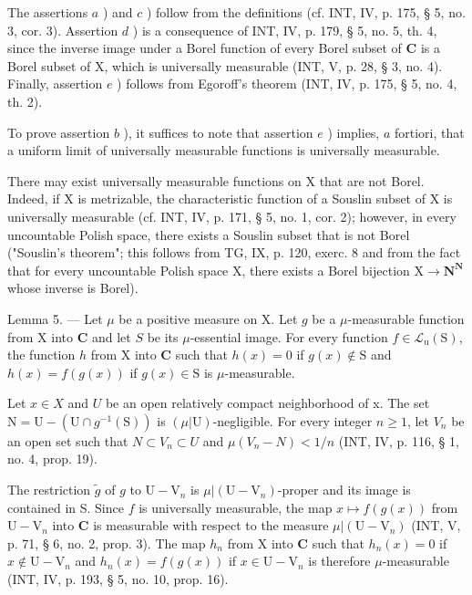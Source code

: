 The assertions \(a\) ) and \(c\) ) follow from the definitions (cf. INT, IV, p. 175, § 5, no. 3, cor. 3). Assertion \(d\) ) is a consequence of INT, IV, p. 179, § 5, no. 5, th. 4, since the inverse image under a Borel function of every Borel subset of \(\mathbf{C}\) is a Borel subset of X, which is universally measurable (INT, V, p. 28, § 3, no. 4). Finally, assertion \(e\) ) follows from Egoroff's theorem (INT, IV, p. 175, § 5, no. 4, th. 2).

To prove assertion \(b\) ), it suffices to note that assertion \(e\) ) implies, \(a\) fortiori, that a uniform limit of universally measurable functions is universally measurable.

There may exist universally measurable functions on X that are not Borel. Indeed, if X is metrizable, the characteristic function of a Souslin subset of X is universally measurable (cf. INT, IV, p. 171, § 5, no. 1, cor. 2); however, in every uncountable Polish space, there exists a Souslin subset that is not Borel ("Souslin's theorem"; this follows from TG, IX, p. 120, exerc. 8 and from the fact that for every uncountable Polish space X, there exists a Borel bijection \(\mathrm{X}\to\mathbf{N}^{\mathbf{N}}\) whose inverse is Borel).

Lemma 5. --- Let \(\mu\) be a positive measure on X. Let \(g\) be a \(\mu\)-measurable function from X into \(\mathbf{C}\) and let \(S\) be its \(\mu\)-essential image. For every function \(f \in \mathcal{L}_{\mathrm{u}}(\mathrm{S})\), the function \(h\) from X into \(\mathbf{C}\) such that \(h(x) = 0\) if \(g(x) \notin \mathrm{S}\) and \(h(x) = f(g(x))\) if \(g(x) \in \mathrm{S}\) is \(\mu\)-measurable.

Let \(x \in X\) and \(U\) be an open relatively compact neighborhood of x. The set \(\mathrm{N} = \mathrm{U} - (\mathrm{U} \cap g^{-1}(\mathrm{S}))\) is \((\mu|\mathrm{U})\)-negligible. For every integer \(n \geqslant 1\), let \(V_{n}\) be an open set such that \(N \subset V_{n} \subset U\) and \(\mu(V_{n} - N) < 1/n\) (INT, IV, p. 116, § 1, no. 4, prop. 19).

The restriction \(\widetilde{g}\) of \(g\) to \(\mathrm{U}-\mathrm{V}_n\) is \(\mu|(\mathrm{U}-\mathrm{V}_n)\)-proper and its image is contained in S. Since \(f\) is universally measurable, the map \(x\mapsto f(g(x))\) from \(\mathrm{U}-\mathrm{V}_n\) into \(\mathbf{C}\) is measurable with respect to the measure \(\mu|(\mathrm{U}-\mathrm{V}_n)\) (INT, V, p. 71, § 6, no. 2, prop. 3). The map \(h_n\) from X into \(\mathbf{C}\) such that \(h_n(x) = 0\) if \(x\notin \mathrm{U}-\mathrm{V}_n\) and \(h_n(x) = f(g(x))\) if \(x\in \mathrm{U}-\mathrm{V}_n\) is therefore \(\mu\)-measurable (INT, IV, p. 193, § 5, no. 10, prop. 16).

